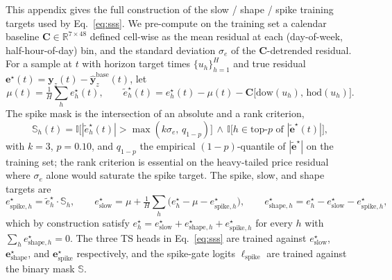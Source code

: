 \documentclass{article}
\begin{document}
This appendix gives the full construction of the slow / shape / spike training targets used by Eq.~\ref{eq:sss}.
We pre-compute on the training set a calendar baseline $\mathbf{C}\in\mathbb{R}^{7\times 48}$ defined cell-wise as the mean residual at each (day-of-week, half-hour-of-day) bin, and the standard deviation $\sigma_e$ of the $\mathbf{C}$-detrended residual.
For a sample at $t$ with horizon target times $\{u_h\}_{h=1}^H$ and true residual $\bm{e}^{\star}(t)=\bm{y}_z(t)-\hat{\bm{y}}^{\text{base}}_z(t)$, let
\begin{equation}
    \mu(t)=\tfrac{1}{H}\textstyle\sum_h e^{\star}_h(t),\qquad
    \tilde{e}^{\star}_h(t)=e^{\star}_h(t)-\mu(t)-\mathbf{C}\!\bigl[\mathrm{dow}(u_h),\,\mathrm{hod}(u_h)\bigr].
    \label{eq:detrend}
\end{equation}
The spike mask is the intersection of an absolute and a rank criterion,
\begin{equation}
    \mathbb{S}_h(t)=\mathbb{I}\!\bigl[|\tilde{e}^{\star}_h(t)|>\max(k\sigma_e,\,q_{1-p})\bigr]\,\wedge\,\mathbb{I}\!\bigl[h\in\text{top-}p\text{ of }|\tilde{\bm{e}}^{\star}(t)|\bigr],
    \label{eq:spike-mask}
\end{equation}
with $k{=}3$, $p{=}0.10$, and $q_{1-p}$ the empirical $(1{-}p)$-quantile of $|\tilde{\bm{e}}^{\star}|$ on the training set; the rank criterion is essential on the heavy-tailed price residual where $\sigma_e$ alone would saturate the spike target.
The spike, slow, and shape targets are
\begin{equation}
    e^{\star}_{\text{spike},h}=\tilde{e}^{\star}_h\cdot\mathbb{S}_h,\qquad
    e^{\star}_{\text{slow}}=\mu+\tfrac{1}{H}\textstyle\sum_h\bigl(e^{\star}_h-\mu-e^{\star}_{\text{spike},h}\bigr),\qquad
    e^{\star}_{\text{shape},h}=e^{\star}_h-e^{\star}_{\text{slow}}-e^{\star}_{\text{spike},h},
    \label{eq:targets}
\end{equation}
which by construction satisfy $e^{\star}_h=e^{\star}_{\text{slow}}+e^{\star}_{\text{shape},h}+e^{\star}_{\text{spike},h}$ for every $h$ with $\sum_h e^{\star}_{\text{shape},h}=0$.
The three TS heads in Eq.~\ref{eq:sss} are trained against $e^{\star}_{\text{slow}}$, $\bm{e}^{\star}_{\text{shape}}$, and $\bm{e}^{\star}_{\text{spike}}$ respectively, and the spike-gate logits $\bm{\ell}_{\text{spike}}$ are trained against the binary mask $\mathbb{S}$.






\end{document}
